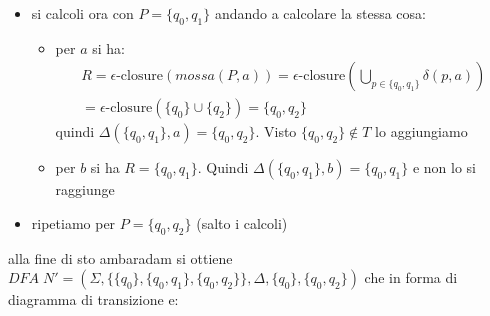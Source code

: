 {\begin{itemize}
\begin{itemize}
            Si definisca $\delta(S,a)=\{q_0\}$ e visto che $\{q_0\}\in T$ non lo andiamo a ri-aggiungere
            \item per il carattere $a$ calcoliamo con $P=S=\{q_0\}$:
              \[
                \begin{array}{l}
                    R = \epsilon\text{-closure}(mossa(P,b)) = \epsilon\text{-closure}\left(\bigcup_{p\in\{q_0\}}\delta (p,b)\right) \\                
                    =\epsilon\text{-closure}(\delta(q_0,b)) =\epsilon\text{-closure}(\{q_0, q_1\}) =\{q_0,q_1\}
                \end{array}
              \]
            visto che $\{q_0,q_1\}\notin T$ lo andiamo ad aggiungere
        \end{itemize}
        \item si calcoli ora con $P=\{q_0, q_1\}$ andando a calcolare la stessa cosa:
        \begin{itemize}
            \item per $a$ si ha:
              \[
                \begin{array}{l}
                    R=    \epsilon\text{-closure} (mossa(P,a)) = \epsilon\text{-closure}\left(\bigcup_{p\in\{q_0, q_1\}}\delta(p,a)\right)\\                 
                    = \epsilon\text{-closure} (\{q_0\}\cup\{ q_2\}) = \{q_0,q_2\}
                \end{array}
              \]
            quindi $\Delta(\{q_0,q_1\}, a)=\{q_0,q_2\}$. Visto $\{q_0,q_2\}\notin T$ lo aggiungiamo 
            \item  per $b$ si ha $R=\{q_0,q_1\}$. Quindi $\Delta(\{q_0, q_1\}, b) = \{q_0,q_1\}$ e non lo si raggiunge
        \end{itemize}
        \item ripetiamo per $P=\{q_0, q_2\}$ (salto i calcoli)
    \end{itemize}

    alla fine di sto ambaradam si ottiene $DFA \;N'=(\Sigma, \{\{q_0\},\{q_0,q_1\}, \{q_0,q_2\}\}, \Delta, \{q_0\}, \{q_0,q_2\})$ che in forma di diagramma di transizione e:
    \begin{center}
\end{center}}
